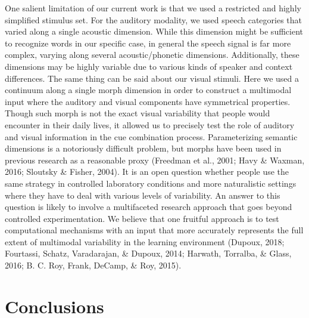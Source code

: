 \documentclass[english,,man,floatsintext]{apa6}
\theoremstyle{definition}
\theoremstyle{definition}
\theoremstyle{definition}
\theoremstyle{remark}
\begin{document}
One salient limitation of our current work is that we used a restricted
and highly simplified stimulus set. For the auditory modality, we used
speech categories that varied along a single acoustic dimension. While
this dimension might be sufficient to recognize words in our specific
case, in general the speech signal is far more complex, varying along
several acoustic/phonetic dimensions. Additionally, these dimensions may
be highly variable due to various kinds of speaker and context
differences. The same thing can be said about our visual stimuli. Here
we used a continuum along a single morph dimension in order to construct
a multimodal input where the auditory and visual components have
symmetrical properties. Though such morph is not the exact visual
variability that people would encounter in their daily lives, it allowed
us to precisely test the role of auditory and visual information in the
cue combination process. Parameterizing semantic dimensions is a
notoriously difficult problem, but morphs have been used in previous
research as a reasonable proxy (Freedman et al., 2001; Havy \& Waxman,
2016; Sloutsky \& Fisher, 2004). It is an open question whether people
use the same strategy in controlled laboratory conditions and more
naturalistic settings where they have to deal with various levels of
variability. An answer to this question is likely to involve a
multifaceted research approach that goes beyond controlled
experimentation. We believe that one fruitful approach is to test
computational mechanisms with an input that more accurately represents
the full extent of multimodal variability in the learning environment
(Dupoux, 2018; Fourtassi, Schatz, Varadarajan, \& Dupoux, 2014; Harwath,
Torralba, \& Glass, 2016; B. C. Roy, Frank, DeCamp, \& Roy, 2015).

\section{Conclusions}\label{conclusions}
\end{document}
